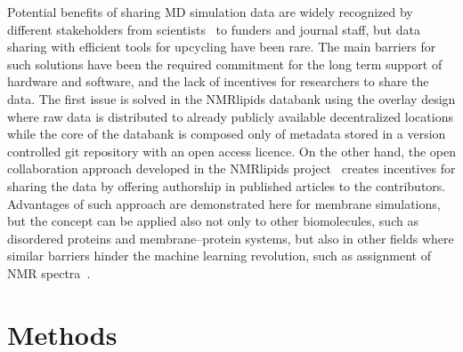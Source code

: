 \documentclass[fleqn,10pt]{wlscirep}
\begin{document}
Potential benefits of sharing MD simulation data are widely recognized by different stakeholders from scientists~\cite{feig99,tai04,silva06,abraham19,hildebrand19,hospital20,abriata20,espigares20} to funders and journal staff, but data sharing with efficient tools for upcycling have been rare. The main barriers for such solutions have been the required commitment for the long term support of hardware and software, and the lack of incentives for researchers to share the data. The first issue is solved in the NMRlipids databank using the overlay design where raw data is distributed to already publicly available decentralized locations while the core of the databank is composed only of metadata stored in a version controlled git repository with an open access licence. On the other hand, the open collaboration approach developed in the NMRlipids project~\cite{botan15} creates incentives for sharing the data by offering authorship in published articles to the contributors. Advantages of such approach are demonstrated here for membrane simulations, but the concept can be applied also not only to other biomolecules, such as disordered proteins and membrane--protein systems, but also in other fields where similar barriers hinder the machine learning revolution, such as assignment of NMR spectra~\cite{klukowski22}. 



\newpage


\section{Methods}

\end{document}
